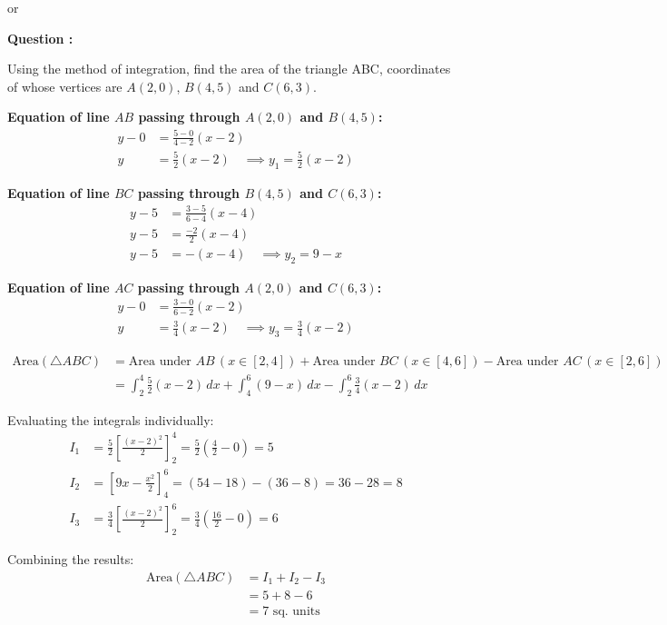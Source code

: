 \begin{enumerate}[label=\thesubsection.\arabic*, ref=\thesubsection.\theenumi]
\begin{center}
    or
\end{center}
\textbf{Question :}

Using the method of integration, find the area of the triangle ABC, coordinates of whose vertices are $A(2,0)$, $B(4,5)$ and $C(6,3)$.   

\solution 

\textbf{Equation of line $AB$ passing through $A(2,0)$ and $B(4,5)$:}
\begin{align*}
y - 0 &= \frac{5 - 0}{4 - 2}(x - 2) \\
y &= \frac{5}{2}(x - 2) \quad \implies y_1 = \frac{5}{2}(x - 2)
\end{align*}

\textbf{Equation of line $BC$ passing through $B(4,5)$ and $C(6,3)$:}
\begin{align*}
y - 5 &= \frac{3 - 5}{6 - 4}(x - 4) \\
y - 5 &= \frac{-2}{2}(x - 4) \\
y - 5 &= -(x - 4) \quad \implies y_2 = 9 - x
\end{align*}

\textbf{Equation of line $AC$ passing through $A(2,0)$ and $C(6,3)$:}
\begin{align*}
y - 0 &= \frac{3 - 0}{6 - 2}(x - 2) \\
y &= \frac{3}{4}(x - 2) \quad \implies y_3 = \frac{3}{4}(x - 2)
\end{align*}

\begin{align*}
\text{Area}(\triangle ABC) &= \text{Area under } AB \, (x \in [2,4]) + \text{Area under } BC \, (x \in [4,6]) - \text{Area under } AC \, (x \in [2,6]) \\
&= \int_{2}^{4} \frac{5}{2}(x - 2)\,dx + \int_{4}^{6} (9 - x)\,dx - \int_{2}^{6} \frac{3}{4}(x - 2)\,dx
\end{align*}

Evaluating the integrals individually:
\begin{align*}
I_1 &= \frac{5}{2} \left[ \frac{(x-2)^2}{2} \right]_{2}^{4} = \frac{5}{2} \left( \frac{4}{2} - 0 \right) = 5 \\
I_2 &= \left[ 9x - \frac{x^2}{2} \right]_{4}^{6} = \left( 54 - 18 \right) - \left( 36 - 8 \right) = 36 - 28 = 8 \\
I_3 &= \frac{3}{4} \left[ \frac{(x-2)^2}{2} \right]_{2}^{6} = \frac{3}{4} \left( \frac{16}{2} - 0 \right) = 6
\end{align*}

Combining the results:
\begin{align*}
\text{Area}(\triangle ABC) &= I_1 + I_2 - I_3 \\
&= 5 + 8 - 6 \\
&= 7 \text{ sq. units}
\end{align*}


\end{enumerate}
